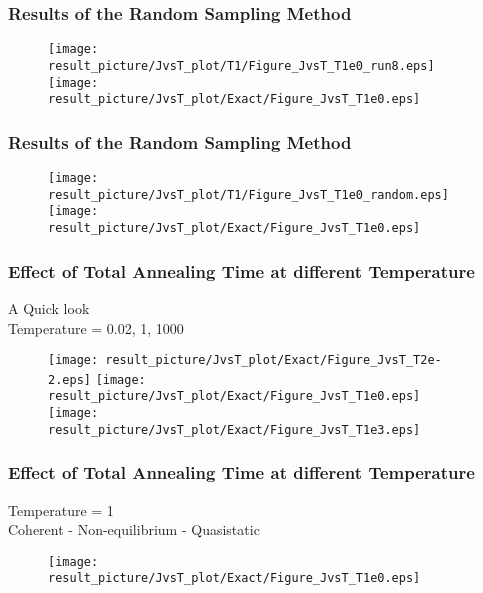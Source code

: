 \documentclass{beamer}
\begin{document}
\begin{frame}
	\frametitle{Results of the Random Sampling Method}
	\begin{figure}
		\centering
		\texttt{[image: result\_picture/JvsT\_plot/T1/Figure\_JvsT\_T1e0\_run8.eps]}
		\hfill
		\texttt{[image: result\_picture/JvsT\_plot/Exact/Figure\_JvsT\_T1e0.eps]}		
		
	\end{figure}
\end{frame}

\begin{frame}
	\frametitle{Results of the Random Sampling Method}
	\begin{figure}
		\centering
		\texttt{[image: result\_picture/JvsT\_plot/T1/Figure\_JvsT\_T1e0\_random.eps]}
		\hfill
		\texttt{[image: result\_picture/JvsT\_plot/Exact/Figure\_JvsT\_T1e0.eps]}		
		
	\end{figure}
\end{frame}

\begin{frame}
	\frametitle{Effect of Total Annealing Time at different Temperature}
	A Quick look\\
	Temperature = 0.02, 1, 1000
	\begin{figure}
		\centering
		\texttt{[image: result\_picture/JvsT\_plot/Exact/Figure\_JvsT\_T2e-2.eps]}
		\hfill
		\texttt{[image: result\_picture/JvsT\_plot/Exact/Figure\_JvsT\_T1e0.eps]}
		\hfill
		\texttt{[image: result\_picture/JvsT\_plot/Exact/Figure\_JvsT\_T1e3.eps]}
	\end{figure}
\end{frame}

\begin{frame}
	\frametitle{Effect of Total Annealing Time at different Temperature}
	Temperature = 1\\
	Coherent - Non-equilibrium - Quasistatic
	\begin{figure}
		\centering
		\texttt{[image: result\_picture/JvsT\_plot/Exact/Figure\_JvsT\_T1e0.eps]}
	\end{figure}
\end{frame}
\end{document}
